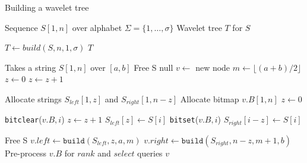 \begin{algorithm}[ht!]
    \caption{Building a wavelet tree}\label{alg:build_wt}
    \begin{algorithmic}
        \Require Sequence $S[1,n]$ over alphabet $\Sigma = \{1,\dots,\sigma\}$
        \Ensure Wavelet tree $T$ for $S$
        \vspace{0.4cm}

        \State $T \gets build(S,n,1,\sigma)$
        \State \Return $T$
        \EndFunction

        \vspace{0.4cm}
         \Comment Takes a string $S[1,n]$ over $[a,b]$
        \State Free S
        \State \Return null
        \EndIf
        \State $v \gets$ new node
        \State $m \gets \lfloor (a+b)/2 \rfloor$
        \State $z \gets 0$ 
        \State $z \gets z+1$
        \EndIf
        \EndFor

        \State Allocate strings $S_{left}[1,z]$ and $S_{right}[1,n-z]$
        \State Allocate bitmap $v.B[1,n]$
        \State $z \gets 0$

        \State \texttt{bitclear}($v.B,i$) 
        \State $z \gets z+1$
        \State $S_{left}[z] \gets S[i]$
        \Else
        \State \texttt{bitset}($v.B,i$) 
        \State $S_{right}[i-z] \gets S[i]$
        \EndIf
        \EndFor

        \State Free S
        \State $v.left \gets \texttt{build}(S_{left},z,a,m)$
        \State $v.right \gets \texttt{build}(S_{right},n-z,m+1,b)$
        \State Pre-process $v.B$ for $rank$ and $select$ queries
        \State \Return $v$
        \EndFunction
    \end{algorithmic}
\end{algorithm}

